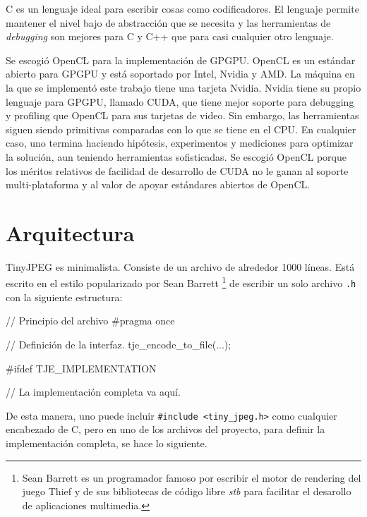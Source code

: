 C es un lenguaje ideal para escribir cosas como codificadores. El lenguaje
permite mantener el nivel bajo de abstracción que se necesita y las
herramientas de \emph{debugging} son mejores para C y C++ que para casi
cualquier otro lenguaje.

Se escogió OpenCL para la implementación de GPGPU. OpenCL es un estándar abierto
para GPGPU y está soportado por Intel, Nvidia y AMD. La máquina en la que se
implementó este trabajo tiene una tarjeta Nvidia. Nvidia tiene su propio
lenguaje para GPGPU, llamado CUDA, que tiene mejor soporte para debugging y
profiling que OpenCL para sus tarjetas de video. Sin embargo, las herramientas
siguen siendo primitivas comparadas con lo que se tiene en el CPU. En cualquier
caso, uno termina haciendo hipótesis, experimentos y mediciones para optimizar la
solución, aun teniendo herramientas sofisticadas. Se escogió OpenCL porque los
méritos relativos de facilidad de desarrollo de CUDA no le ganan al soporte
multi-plataforma y al valor de apoyar estándares abiertos de OpenCL.


\section{Arquitectura}

TinyJPEG es minimalista. Consiste de un archivo de alrededor 1000 líneas. Está
escrito en el estilo popularizado por Sean Barrett \footnote{Sean Barrett es un
programador famoso por escribir el motor de rendering del juego Thief y de sus
bibliotecas de código libre \emph{stb} para facilitar el desarollo de
aplicaciones multimedia.} de escribir un solo archivo \verb+.h+ con la
siguiente estructura:

\label{alg:stb}
\begin{code}[language=C][h]
    // Principio del archivo
    #pragma once

    // Definición de la interfaz.
    tje_encode_to_file(...);

    #ifdef TJE_IMPLEMENTATION

    // La implementación completa va aquí.
\end{code}

De esta manera, uno puede incluir \verb+#include <tiny_jpeg.h>+ como cualquier
encabezado de C, pero en uno de los archivos del proyecto, para definir la
implementación completa, se hace lo siguiente.

